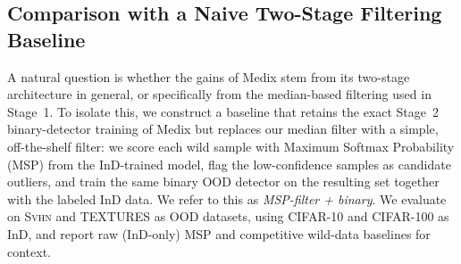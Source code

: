 \documentclass[10pt]{article} %
\theoremstyle{plain}
\theoremstyle{definition}
\begin{document}
\subsection{Comparison with a Naive Two-Stage Filtering Baseline}
\label{appendix:msp_filter_baseline}
A natural question is whether the gains of Medix stem from its two-stage architecture in general, or specifically from the median-based filtering used in Stage~1. To isolate this, we construct a baseline that retains the exact Stage~2 binary-detector training of Medix but replaces our median filter with a simple, off-the-shelf filter: we score each wild sample with Maximum Softmax Probability (MSP) \citep{hendrycks2017a} from the InD-trained model, flag the low-confidence samples as candidate outliers, and train the same binary OOD detector on the resulting set together with the labeled InD data. We refer to this as \textit{MSP-filter + binary}. We evaluate on \textsc{Svhn} and \textsc{TEXTURES} as OOD datasets, using CIFAR-10 and CIFAR-100 as InD, and report raw (InD-only) MSP and competitive wild-data baselines for context.
\end{document}

